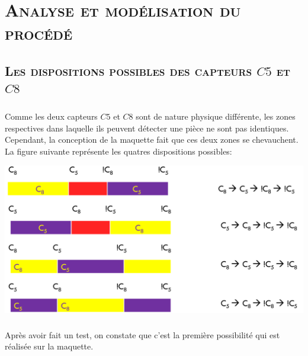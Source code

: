 \chapter{\textsc{Analyse et modélisation du procédé}}

	\section{\textsc{Les dispositions possibles des capteurs $C5$ et $C8$}}	
	\paragraph{} 
	Comme les deux capteurs $C5$ et $C8$ sont de nature physique différente, les zones respectives dans laquelle ils peuvent détecter une pièce ne sont pas identiques. Cependant, la conception de la maquette fait que ces deux zones se chevauchent. La figure suivante représente les quatres dispositions possibles:
	
	\begin{center}
	\includegraphics[scale=0.4]{c5.png}
	\label{fig2}
	\end{center} 

	\paragraph{} Après avoir fait un test, on constate que c'est la première possibilité qui est réalisée sur la maquette. 
	
%	


